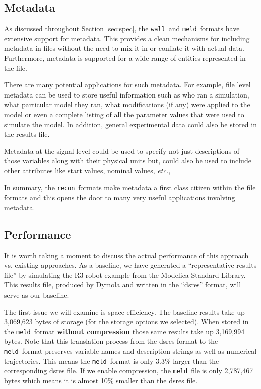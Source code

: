 \documentclass[11pt,a4paper,twocolumn]{article}
\newcommand{\recon}{\texttt{recon}}
\newcommand{\wall}{\texttt{wall}}
\newcommand{\meld}{\texttt{meld}}
\begin{document}
\subsection{Metadata}


As discussed throughout Section \ref{sec:spec}, the \wall\ and
\meld\ formats have extensive support for metadata.  This provides a
clean mechanisms for including metadata in files without the need to
mix it in or conflate it with actual data.  Furthermore, metadata is
supported for a wide range of entities represented in the file.

There are many potential applications for such metadata.  For example,
file level metadata can be used to store useful information such as
who ran a simulation, what particular model they ran, what
modifications (if any) were applied to the model or even a complete
listing of all the parameter values that were used to simulate the
model.  In addition, general experimental data could also be stored in
the results file.

Metadata at the signal level could be used to specify not just
descriptions of those variables along with their physical units but,
could also be used to include other attributes like start values,
nominal values, \textit{etc.},

In summary, the \recon\ formats make metadata a first class citizen
within the file formats and this opens the door to many very useful
applications involving metadata.


\subsection{Performance}

It is worth taking a moment to discuss the actual performance of this
approach vs. existing approaches.  As a baseline, we have generated a
``representative results file'' by simulating the R3 robot example
from the Modelica Standard Library.  This results file, produced by
Dymola and written in the ``dsres'' format, will serve as our
baseline.


The first issue we will examine is space efficiency.  The baseline
results take up 3,069,623 bytes of storage (for the storage options we
selected).  When stored in the \meld\ format \textbf{without compression}
those same results take up 3,169,994 bytes.  Note that this
translation process from the dsres format to the \meld\ format
preserves variable names and description strings as well as numerical
trajectories.  This means the \meld\ format is only 3.3\% larger than
the corresponding dsres file.  If we enable compression, the
\meld\ file is only 2,787,467 bytes which means it is almost 10\%
smaller than the dsres file.
\end{document}
